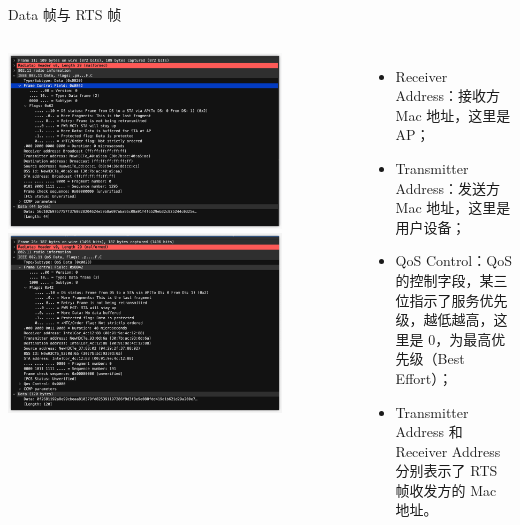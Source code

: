 \documentclass[aspectratio=169]{beamer}
\begin{document}
    \begin{frame}{Data 帧与 RTS 帧}
      \begin{columns}[onlytextwidth]
        \includegraphics[width=0.8\textwidth]{resources/data.png}
        \includegraphics[width=0.8\textwidth]{resources/rts.png}
          \begin{itemize}
            \item Receiver Address：接收⽅ Mac 地址，这⾥是 AP；
            \item Transmitter Address：发送⽅ Mac 地址，这⾥是⽤户设备；
            \item QoS Control：QoS 的控制字段，某三位指⽰了服务优先级，越低越⾼，这⾥是 0，为最⾼优先级（Best Effort）；
            \item Transmitter Address 和 Receiver Address 分别表⽰了 RTS 帧收发⽅的 Mac 地址。
          \end{itemize}
      \end{columns}
      \justifying
    \end{frame}
\end{document}
